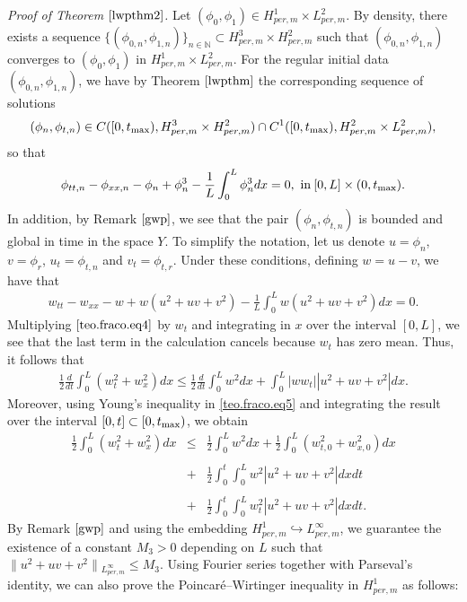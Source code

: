 \documentclass[12pt,reqno,a4paper]{amsart} %
\numberwithin{equation}{section}
\numberwithin{figure}{section}
\begin{document}
\noindent \textit{Proof of Theorem $\ref{lwpthm2}$.} Let $(\phi_0,\phi_1)\in H_{per,m}^1\times L_{per,m}^2$. By density, there exists a sequence $\{ (\phi_{0,n},\phi_{1,n})\}_{n\in\mathbb{N}} \subset H_{per,m}^3\times H_{per,m}^2$ such that
$(\phi_{0,n},\phi_{1,n})$ converges to $ (\phi_0,\phi_1)  $ in $H_{per,m}^1\times L_{per,m}^2$. For the regular initial data $(\phi_{0,n},\phi_{1,n})$, we have by Theorem $\ref{lwpthm}$ the corresponding sequence of solutions 
\begin{align} \label{teo.fraco.eq1}
	(\phi_n, \phi_{t,n})\in  C([0,t_{\rm{max}}),H_{per,m}^3\times H_{per,m}^2)\cap C^1([0,t_{\rm{max}}),H_{per,m}^2\times L_{per,m}^2),
\end{align}so that 
\begin{align} \label{teo.fraco.eq2}
	\phi_{tt,n}-\phi_{xx,n}-\phi_n+\phi_n^3-\frac{1}{L}\int_0^L\phi_n^3dx=0, \  {\rm{in}} \: [0,L]\times(0,t_{\rm{max}}).
\end{align}
\indent In addition, by Remark $\ref{gwp}$, we see that the pair $(\phi_n,\phi_{t,n})$ is bounded and global in time in the space $Y$. To simplify the notation, let us denote $u=\phi_n$, $v=\phi_r$, $u_t=\phi_{t,n}$ and $v_t=\phi_{t,r}$. Under these conditions, defining $w=u-v$, we have that
\begin{align} \label{teo.fraco.eq4}
	w_{tt}-w_{xx}-w+w(u^2+uv+v^2)-\frac{1}{L}\int_0^Lw(u^2+uv+v^2)dx=0.
\end{align}
Multiplying $\eqref{teo.fraco.eq4}$ by $w_t$ and integrating in $x$ over the interval $[0,L]$, we see that the last term in the calculation cancels because $w_t$ has zero mean. Thus, it follows that
\begin{align} \label{teo.fraco.eq5}
\frac{1}{2}\frac{d}{dt}	\displaystyle\int_0^L(w_t^2+w_x^2)dx\leq  \frac{1}{2}\frac{d}{dt}\int_0^Lw^2dx +\int_0^L|ww_t||u^2+uv+v^2|dx.
\end{align}
\indent Moreover, using Young's inequality in \eqref{teo.fraco.eq5} and integrating the result over the interval $[0,t]\subset[0,t_{\rm{max}})$, we obtain
\begin{equation} \label{teo.fraco.eq6}\begin{array}{lllll}
\displaystyle	\frac{1}{2} 	\displaystyle\int_0^L(w_t^2+w_x^2)dx&\leq &\displaystyle \frac{1}{2}\int_0^Lw^2dx  +	\frac{1}{2} 	\displaystyle\int_0^L(w_{t,0}^2+w_{x,0}^2)dx \\\\
	&+&\displaystyle	\frac{1}{2}\int_0^t\int_0^Lw^2|u^2+uv+v^2|dxdt\\\\
	&+&\displaystyle	\frac{1}{2}\int_0^t\int_0^Lw_t^2|u^2+uv+v^2|dxdt. 
\end{array}
\end{equation} By Remark $\ref{gwp}$ and using the embedding $H_{per,m}^1\hookrightarrow L_{per,m}^{\infty}$, we guarantee the existence of a constant $M_3>0$ depending on $L$ such that $ \|u^2+uv+v^2\|\displaystyle_{L_{per,m}^\infty}\leq M_3$. Using Fourier series together with Parseval's identity, we can also prove the Poincaré–Wirtinger inequality in $H_{per,m}^1$ as follows:
\end{document}
